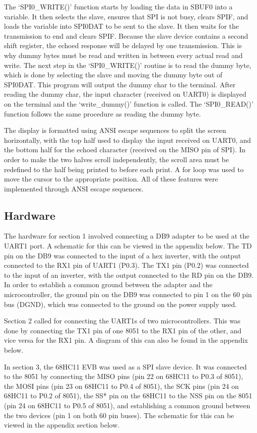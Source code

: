 \documentclass[12pt]{article}
\begin{document}
The `SPI0\_WRITE()' function starts by loading the data in SBUF0 into a variable. It then selects the slave, ensures that SPI is not busy, clears SPIF, and loads the variable into SPI0DAT to be sent to the slave. It then waits for the transmission to end and clears SPIF. Because the slave device contains a second shift register, the echoed response will be delayed by one transmission. This is why dummy bytes must be read and written in between every actual read and write. The next step in the `SPI0\_WRITE()' routine is to read the dummy byte, which is done by selecting the slave and moving the dummy byte out of SPI0DAT. This program will output the dummy char to the terminal. After reading the dummy char, the input character (received on UART0) is displayed on the terminal and the `write\_dummy()' function is called. The `SPI0\_READ()' function follows the same procedure as reading the dummy byte.

The display is formatted using ANSI escape sequences to split the screen horizontally, with the top half used to display the input received on UART0, and the bottom half for the echoed character (received on the MISO pin of SPI). In order to make the two halves scroll independently, the scroll area must be redefined to the half being printed to before each print. A for loop was used to move the cursor to the appropriate position. All of these features were implemented through ANSI escape sequences.
\subsection{Hardware}
The hardware for section 1 involved connecting a DB9 adapter to be used at the UART1 port. A schematic for this can be viewed in the appendix below. The TD pin on the DB9 was connected to the input of a hex inverter, with the output connected to the RX1 pin of UART1 (P0.3). The TX1 pin (P0.2) was connected to the input of an inverter, with the output connected to the RD pin on the DB9. In order to establish a common ground between the adapter and the microcontroller, the ground pin on the DB9 was connected to pin 1 on the 60 pin bus (DGND), which was connected to the ground on the power supply used. 
 
Section 2 called for connecting the UART1s of two microcontrollers. This was done by connecting the TX1 pin of one 8051 to the RX1 pin of the other, and vice versa for the RX1 pin. A diagram of this can also be found in the appendix below.

In section 3, the 68HC11 EVB was used as a SPI slave device. It was connected to the 8051 by connecting the MISO pins (pin 22 on 68HC11 to P0.3 of 8051), the MOSI pins (pin 23 on 68HC11 to P0.4 of 8051), the SCK pins (pin 24 on 68HC11 to P0.2 of 8051), the SS* pin on the 68HC11 to the NSS pin on the 8051 (pin 24 on 68HC11 to P0.5 of 8051), and establishing a common ground between the two devices (pin 1 on both 60 pin buses). The schematic for this can be viewed in the appendix section below. 
\end{document}
